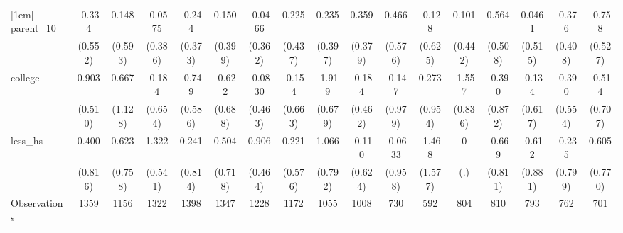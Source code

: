 {\begin{tabular}{l*{16}{c}}
[1em]
parent\_10           &      -0.334         &       0.148         &     -0.0575         &      -0.244         &       0.150         &     -0.0466         &       0.225         &       0.235         &       0.359         &       0.466         &      -0.128         &       0.101         &       0.564         &      0.0461         &      -0.376         &      -0.758         \\
                    &     (0.552)         &     (0.593)         &     (0.386)         &     (0.373)         &     (0.399)         &     (0.362)         &     (0.437)         &     (0.397)         &     (0.379)         &     (0.576)         &     (0.625)         &     (0.442)         &     (0.508)         &     (0.515)         &     (0.408)         &     (0.527)         \\
[1em]
college             &       0.903         &       0.667         &      -0.184         &      -0.749         &      -0.622         &     -0.0830         &      -0.154         &      -1.919\sym{**} &      -0.184         &      -0.147         &       0.273         &      -1.557         &      -0.390         &      -0.134         &      -0.390         &      -0.514         \\
                    &     (0.510)         &     (1.128)         &     (0.654)         &     (0.586)         &     (0.688)         &     (0.463)         &     (0.663)         &     (0.679)         &     (0.462)         &     (0.979)         &     (0.954)         &     (0.836)         &     (0.872)         &     (0.617)         &     (0.554)         &     (0.707)         \\
[1em]
less\_hs             &       0.400         &       0.623         &       1.322\sym{*}  &       0.241         &       0.504         &       0.906         &       0.221         &       1.066         &      -0.110         &     -0.0633         &      -1.468         &           0         &      -0.669         &      -0.612         &      -0.235         &       0.605         \\
                    &     (0.816)         &     (0.758)         &     (0.541)         &     (0.814)         &     (0.718)         &     (0.464)         &     (0.576)         &     (0.792)         &     (0.624)         &     (0.958)         &     (1.577)         &         (.)         &     (0.811)         &     (0.881)         &     (0.799)         &     (0.770)         \\
\hline
Observations        &        1359         &        1156         &        1322         &        1398         &        1347         &        1228         &        1172         &        1055         &        1008         &         730         &         592         &         804         &         810         &         793         &         762         &         701         \\

\end{tabular}}

